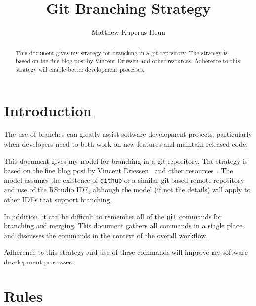 \documentclass{article}
\begin{document}
\title{Git Branching Strategy}
\author{Matthew Kuperus Heun}

\maketitle


\begin{abstract}

This document gives my strategy for branching in a git repository. 
The strategy is based on the fine blog post by Vincent Driessen
and other resources.
Adherence to this strategy will enable better development processes.
\end{abstract}


\section{Introduction} 
\label{sec:introduction}

The use of branches can greatly assist software development projects, 
particularly when developers need to both 
work on new features and maintain released code.

This document gives my model for branching in a git repository. 
The strategy is based on the fine blog post by Vincent Driessen~\cite{Driessen:2010}
and other resources~\cite{Onkelinx:2017, Rankin:2010}.
The model assumes the existence of \texttt{github} or a similar git-based remote repository
and use of the RStudio IDE, 
although the model (if not the details) 
will apply to other IDEs that support branching. 

In addition, it can be difficult to remember 
all of the \texttt{git} commands for branching and merging.
This document gathers all commands in a single place
and discusses the commands in the context of the overall workflow.
 
Adherence to this strategy and use of these commands 
will improve my software development processes.


\section{Rules} 
\label{sec:rules}
\end{document}
